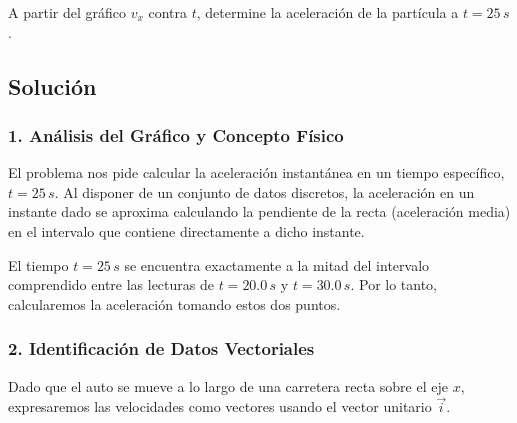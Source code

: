 \documentclass[12pt, a4paper]{article}
\begin{document}
A partir del gráfico $v_x$ contra $t$, determine la aceleración de la partícula a $t = 25 \, \si{s}$.

\begin{center}
\end{center}

\subsection*{Solución}

\subsubsection*{1. Análisis del Gráfico y Concepto Físico}
El problema nos pide calcular la aceleración instantánea en un tiempo específico, $t = 25 \, \si{s}$. Al disponer de un conjunto de datos discretos, la aceleración en un instante dado se aproxima calculando la pendiente de la recta (aceleración media) en el intervalo que contiene directamente a dicho instante.

El tiempo $t = 25 \, \si{s}$ se encuentra exactamente a la mitad del intervalo comprendido entre las lecturas de $t = 20.0 \, \si{s}$ y $t = 30.0 \, \si{s}$. Por lo tanto, calcularemos la aceleración tomando estos dos puntos.

\subsubsection*{2. Identificación de Datos Vectoriales}
Dado que el auto se mueve a lo largo de una carretera recta sobre el eje $x$, expresaremos las velocidades como vectores usando el vector unitario $\vec{i}$.
\end{document}
